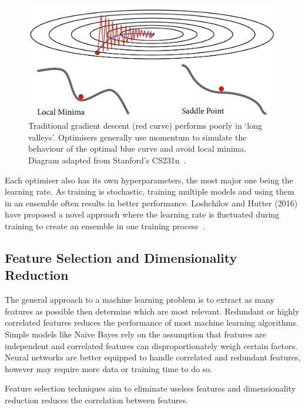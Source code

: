 \documentclass[12pt, twoside]{book}
\begin{document}
\begin{figure}[h]
	\centering\includegraphics[width=0.82\linewidth]{gradescent.png}
	\caption{Traditional gradient descent (red curve) performs poorly in `long valleys'. Optimisers generally use momentum to simulate the behaviour of the optimal blue curve and avoid local minima. Diagram adapted from Stanford's CS231n~\cite{cs231n}.}
\end{figure}

Each optimiser also has its own hyperparameters, the most major one being the learning rate. As training is stochastic, training multiple models and using them in an ensemble often results in better performance. Loshchilov and Hutter (2016) have proposed a novel approach where the learning rate is fluctuated during training to create an ensemble in one training process~\cite{sgdrestarts}. 


\subsection{Feature Selection and Dimensionality Reduction}
\label{fseldimred}
The general approach to a machine learning problem is to extract as many features as possible then determine which are most relevant. Redundant or highly correlated features reduces the performance of most machine learning algorithms. Simple models like Naive Bayes rely on the assumption that features are independent and correlated features can disproportionately weigh certain factors. Neural networks are better equipped to handle correlated and redundant features, however may require more data or training time to do so. 



\begin{highlight}
	Feature selection techniques aim to eliminate useless features and dimensionality reduction reduces the correlation between features.
\end{highlight} 
\end{document}
